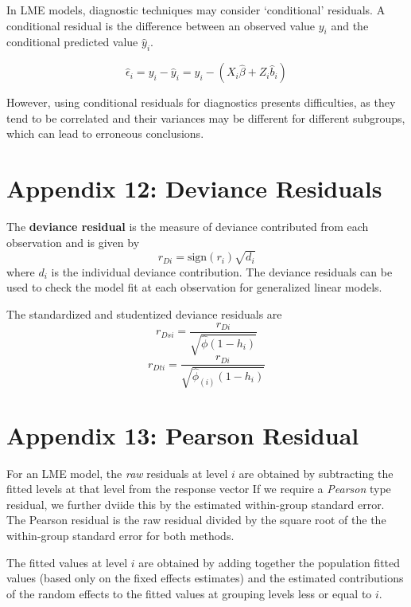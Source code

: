 \documentclass[12pt, a4paper]{report}
\theoremstyle{plain}
\theoremstyle{definition}
\theoremstyle{remark}
\begin{document}
In LME models, diagnostic techniques may consider `conditional' residuals. A conditional residual is the difference between an observed value $y_{i}$ and the conditional predicted value $\hat{y}_{i} $.

\[ \hat{\epsilon}_{i} = y_{i} - \hat{y}_{i} = y_{i} - ( X_{i}\hat{\beta} + Z_{i}\hat{b}_{i}) \]

However, using conditional residuals for diagnostics presents difficulties, as they tend to be correlated and their variances may be different for different subgroups, which can lead to erroneous conclusions.



\newpage



\section{Appendix 12: Deviance Residuals} %

The \textbf{deviance residual} is the measure of deviance contributed from each observation and is given by
\[r_{Di} = \textrm{sign}( r_{i})
\sqrt{ d_{i}}\]
where $d_i$ is the individual deviance contribution. The deviance residuals can be used to check the model fit at each observation for generalized linear models. 


The standardized and studentized deviance residuals are
\[
r_{Dsi} = \frac{r_{Di}}{\sqrt{\hat{ \phi} (1- h_{i})} }\]
\[r_{Dti} = \frac{r_{Di}}{\sqrt{ \hat{ \phi}_{(i)}
		(1- h_{i})}}\]

\section*{Appendix 13: Pearson Residual}%
	For an LME model, the \textit{raw} residuals at level $i$ are obtained by subtracting the fitted levels at that level from the response vector If we require a \textit{Pearson} type residual, we further dviide this by the estimated within-group standard error. The Pearson residual is the raw residual divided by the square root of the the within-group standard error for both methods. 
	
	The fitted values at level $i$ are obtained by adding together the population fitted values (based only on the fixed effects estimates) and the estimated contributions of the random effects to the fitted values at grouping levels less or equal to $i$. 
	
\end{document}

